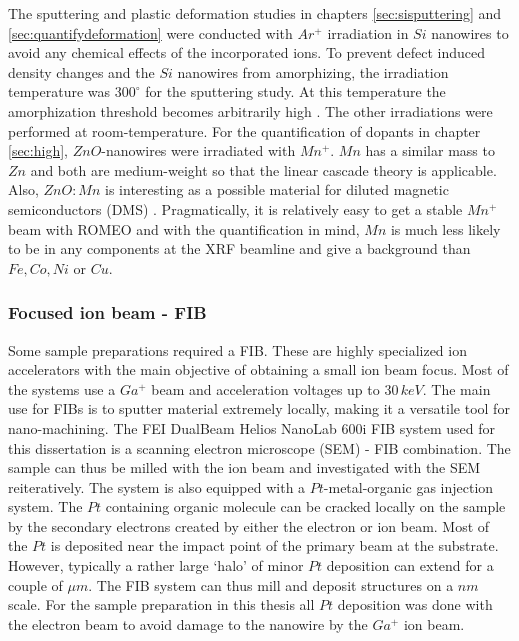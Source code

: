 The sputtering and plastic deformation studies in chapters \ref{sec:sisputtering} and \ref{sec:quantifydeformation} were conducted with $Ar^+$ irradiation in $Si$ nanowires to avoid any chemical effects of the incorporated ions. To prevent defect induced density changes and the $Si$ nanowires from amorphizing, the irradiation temperature was $300^\circ$ for the sputtering study. At this temperature the amorphization threshold becomes arbitrarily high \cite{pelaz_ion-beam-induced_2004}. The other irradiations were performed at room-temperature. For the quantification of dopants in chapter \ref{sec:high}, $ZnO$-nanowires were irradiated with $Mn^+$. $Mn$ has a similar mass to $Zn$ and both are medium-weight so that the linear cascade theory is applicable. Also, $ZnO:Mn$ is interesting as a possible material for diluted magnetic semiconductors (DMS) \cite{furdyna_diluted_1988,norberg_synthesis_2004}. Pragmatically, it is relatively easy to get a stable $Mn^+$ beam with ROMEO and with the quantification in mind, $Mn$ is much less likely to be in any components at the XRF beamline and give a background than $Fe, Co, Ni$ or $Cu$.

 

\subsubsection{Focused ion beam - FIB}

Some sample preparations required a FIB. These are highly specialized ion accelerators with the main objective of obtaining a small ion beam focus. Most of the systems use a $Ga^+$ beam and acceleration voltages up to $30\,keV$. The main use for FIBs is to sputter material extremely locally, making it a versatile tool for nano-machining. The FEI DualBeam Helios NanoLab 600i FIB system used for this dissertation is a scanning electron microscope (SEM) - FIB combination. The sample can thus be milled with the ion beam and investigated with the SEM reiteratively. The system is also equipped with a $Pt$-metal-organic gas injection system. The $Pt$ containing organic molecule can be cracked locally on the sample by the secondary electrons created by either the electron or ion beam. Most of the $Pt$ is deposited near the impact point of the primary beam at the substrate. However, typically a rather large `halo' of minor $Pt$ deposition can extend for a couple of $\mu m$. The FIB system can thus mill and deposit structures on a $nm$ scale. For the sample preparation in this thesis all $Pt$ deposition was done with the electron beam to avoid damage to the nanowire by the $Ga^+$ ion beam.

